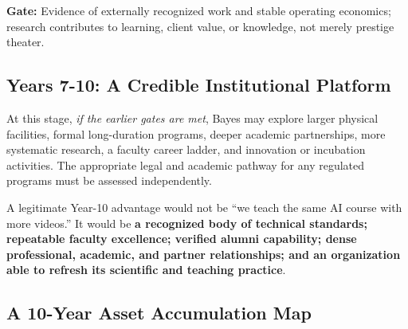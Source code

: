 \vspace{0.5em}
\noindent\textbf{Gate:} Evidence of externally recognized work and stable operating economics; research contributes to learning, client value, or knowledge, not merely prestige theater.

\subsection{Years 7-10: A Credible Institutional Platform}
\label{sec:years_7_10_institutional_platform}

At this stage, \textit{if the earlier gates are met}, Bayes may explore larger physical facilities, formal long-duration programs, deeper academic partnerships, more systematic research, a faculty career ladder, and innovation or incubation activities. The appropriate legal and academic pathway for any regulated programs must be assessed independently.

A legitimate Year-10 advantage would not be ``we teach the same AI course with more videos.'' It would be \textbf{a recognized body of technical standards; repeatable faculty excellence; verified alumni capability; dense professional, academic, and partner relationships; and an organization able to refresh its scientific and teaching practice}.

\subsection{A 10-Year Asset Accumulation Map}
\label{sec:ten_year_asset_accumulation_map}


